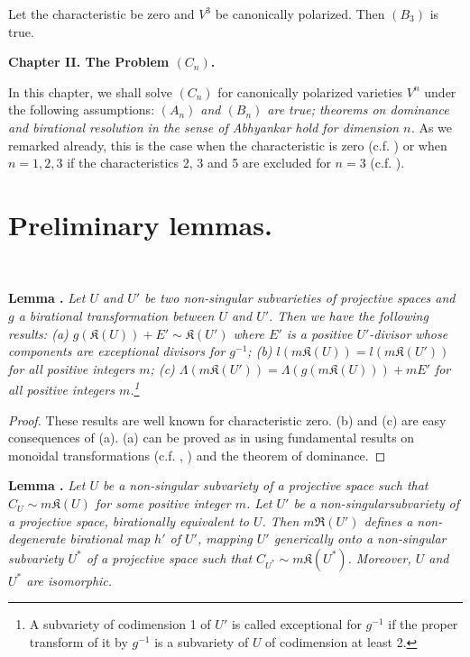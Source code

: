 \begin{coro*}
Let the characteristic be zero and $V^{3}$ be canonically polarized. Then $(B_{3})$ is true.
\end{coro*}

\newpage

\begin{center}
{\Large\bf Chapter II. The Problem \boldmath$(C_{n})$.}
\end{center}

In this chapter, we shall solve $(C_{n})$ for canonically polarized varieties $V^{n}$ under the following assumptions: {\em $(A_{n})$ and $(B_{n})$ are true; theorems on dominance and birational resolution in the sense of Abhyankar hold for dimension $n$.} As we remarked already, this is the case when the characteristic is zero (c.f. \cite{art14-key5}) or when $n=1,2,3$ if the characteristics 2, 3 and 5 are excluded for $n=3$ (c.f. \cite{art14-key35}).

\section{Preliminary lemmas.}\label{art14-sec8}

~

\medskip
\noindent
{\bf Lemma .\label{art14-lem11}}
{\em Let $U$ and $U'$ be two non-singular subvarieties of projective spaces and $g$ a birational transformation between $U$ and $U'$. Then we have the following results: {\rm(a)} $g(\mathfrak{K}(U))+E'\sim \mathfrak{K}(U')$ where $E'$ is a positive $U'$-divisor whose components are exceptional divisors for $g^{-1}$; {\rm(b)} $l(m\mathfrak{K}(U))=l(m\mathfrak{K}(U'))$ for all positive integers $m$; {\rm(c)} $\Lambda(m\mathfrak{K}(U'))=\Lambda(g(m\mathfrak{K}(U)))+mE'$ for all positive integers $m$.\footnote{A subvariety of codimension 1 of $U'$ is called exceptional for $g^{-1}$ if the proper transform of it by $g^{-1}$ is a subvariety of $U$ of codimension at least 2.}}

\begin{proof}
These results are well known for characteristic zero. (b) and (c) are easy consequences of (a). (a) can be proved as in \cite{art14-key33} using fundamental results on monoidal transformations (c.f. \cite{art14-key29}, \cite{art14-key33}) and the theorem of dominance.
\end{proof}

\medskip
\noindent
{\bf Lemma .\label{art14-lem12}}
{\em Let $U$ be a non-singular subvariety of a projective space such that $C_{U}\sim m\mathfrak{K}(U)$ for some positive integer $m$. Let $U'$ be a non-singular\pageoriginale subvariety of a projective space, birationally equivalent to $U$. Then $m\mathfrak{R}(U')$ defines a non-degenerate birational map $h'$ of $U'$, mapping $U'$ generically onto a non-singular subvariety $U^{*}$ of a projective space such that $C_{U^{*}}\sim m\mathfrak{K}(U^{*})$. Moreover, $U$ and $U^{*}$ are isomorphic.}

